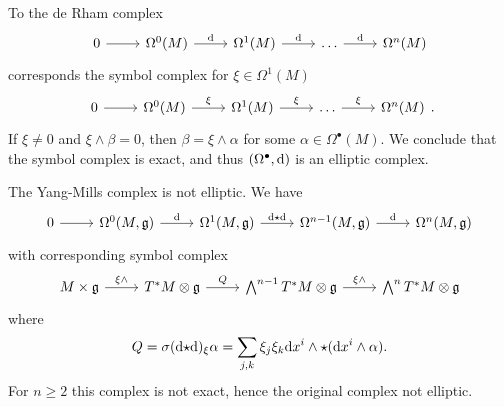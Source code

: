 \begin{example}
  To the de Rham complex
  \begin{equation*}
    \begin{tikzcd}
      0 \arrow[r] &
      \Omega^0 (M) \arrow[r, "\drm"] &
      \Omega^1 (M) \arrow[r, "\drm"] &
      \dots \arrow[r, "\drm"] &
      \Omega^n (M)
    \end{tikzcd}
  \end{equation*}
  corresponds the symbol complex for $\xi \in \Omega^1 (M)$
  \begin{equation*}
    \begin{tikzcd}
      0 \arrow[r] &
      \Omega^0 (M) \arrow[r, "\xi"] &
      \Omega^1 (M) \arrow[r, "\xi"] &
      \dots \arrow[r, "\xi"] &
      \Omega^n (M)
    \end{tikzcd}.
  \end{equation*}
  If $\xi \neq 0$ and $\xi \wedge \beta = 0$, then $\beta = \xi \wedge \alpha$ for some $\alpha \in \Omega^\bullet(M)$. We conclude that the symbol complex is exact, and thus $(\Omega^\bullet, \mathrm{d})$ is an elliptic complex.
\end{example}

\begin{example}
  The Yang-Mills complex is not elliptic. We have
  \begin{equation*}
    \begin{tikzcd}
      0 \arrow[r] &
      \Omega^0(M, \gfrak) \arrow[r, "\drm"] &
      \Omega^1(M, \gfrak) \arrow[r, "\drm \hodge \drm"] &
      \Omega^{n-1}(M, \gfrak) \arrow[r, "\drm"] &
      \Omega^n (M, \gfrak)
    \end{tikzcd}
  \end{equation*}
  with corresponding symbol complex
  \begin{equation*}
    \begin{tikzcd}
      M \times \gfrak \arrow[r, "\xi \wedge"] &
      T^* M \otimes \gfrak \arrow[r, "Q"] &
      \bigwedge^{n-1} T^* M \otimes \gfrak \arrow[r, "\xi \wedge"] &
      \bigwedge^n T^* M \otimes \gfrak
    \end{tikzcd}
  \end{equation*}
  where
  \begin{equation*}
    Q = \sigma(\mathrm{d} {\star} \mathrm{d})_\xi \alpha \\
      = \sum_{j, k} \xi_j \xi_k \mathrm{d} x^i \wedge
      {\star} (\mathrm{d} x^i \wedge \alpha).
  \end{equation*}
  For $n \geq 2$ this complex is not exact, hence the original complex not elliptic.
\end{example}

